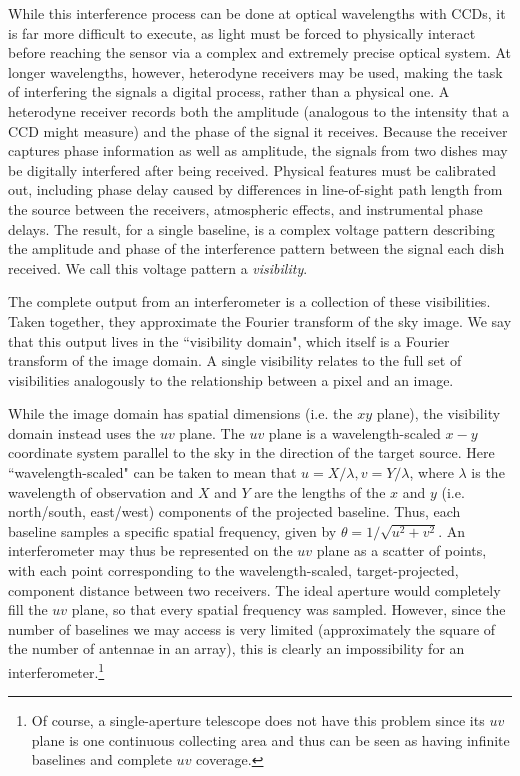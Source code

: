 While this interference process can be done at optical wavelengths with CCDs, it is far more difficult to execute, as light must be forced to physically interact before reaching the sensor via a complex and extremely precise optical system. At longer wavelengths, however, heterodyne receivers may be used, making the task of interfering the signals a digital process, rather than a physical one. A heterodyne receiver records both the amplitude (analogous to the intensity that a CCD might measure) and the phase of the signal it receives. Because the receiver captures phase information as well as amplitude, the signals from two dishes may be digitally interfered after being received. Physical features must be calibrated out, including phase delay caused by differences in line-of-sight path length from the source between the receivers, atmospheric effects, and instrumental phase delays. The result, for a single baseline, is a complex voltage pattern describing the amplitude and phase of the interference pattern between the signal each dish received. We call this voltage pattern a \textit{visibility}.




The complete output from an interferometer is a collection of these visibilities. Taken together, they approximate the Fourier transform of the sky image. We say that this output lives in the ``visibility domain", which itself is a Fourier transform of the image domain. A single visibility relates to the full set of visibilities analogously to the relationship between a pixel and an image.


While the image domain has spatial dimensions (i.e. the $xy$ plane), the visibility domain instead uses the $uv$ plane. The $uv$ plane is a wavelength-scaled $x-y$ coordinate system parallel to the sky in the direction of the target source. Here ``wavelength-scaled" can be taken to mean that $u = X/\lambda, v = Y/\lambda$, where $\lambda$ is the wavelength of observation and $X$ and $Y$ are the lengths of the $x$ and $y$ (i.e. north/south, east/west) components of the projected baseline. Thus, each baseline samples a specific spatial frequency, given by $\theta = 1/\sqrt{u^2 + v^2}$. An interferometer may thus be represented on the $uv$ plane as a scatter of points, with each point corresponding to the wavelength-scaled, target-projected, component distance between two receivers. The ideal aperture would completely fill the $uv$ plane, so that every spatial frequency was sampled. However, since the number of baselines we may access is very limited (approximately the square of the number of antennae in an array), this is clearly an impossibility for an interferometer.\footnote{Of course, a single-aperture telescope does not have this problem since its $uv$ plane is one continuous collecting area and thus can be seen as having infinite baselines and complete $uv$ coverage.}


